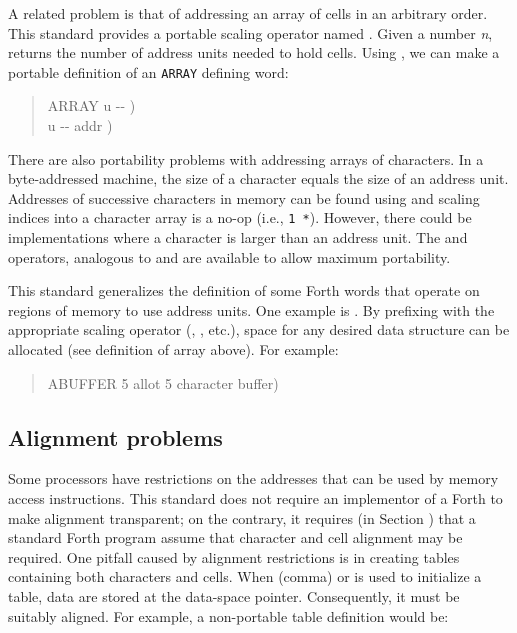 A related problem is that of addressing an array of cells in an
arbitrary order. This standard provides a portable scaling operator named .
Given a number \emph{n},  returns the number of address
units needed to hold  cells.   Using , we can make
a portable definition of an \texttt{ARRAY} defining word:

\begin{quote}\ttfamily
	\word{:} ARRAY  u -{}- )  ~   \\
	\hspace*{2em}  u -{}- addr )   \word{+} \word{;}
\end{quote}

There are also portability problems with addressing arrays of
characters. 
In a byte-addressed machine, the size of a character equals the
size of an address unit.  Addresses of successive characters
in memory can be found using  and scaling indices into a character
array is a no-op (i.e., \texttt{1 *}).  However, there could be
implementations where a character is larger than an address unit.
The  and  operators, analogous to
 and  are available to allow maximum portability.

This standard generalizes the definition of some Forth words that operate
on regions of memory to use address units. One example is
.  By prefixing  with the appropriate scaling operator
(, , etc.), space for any desired data structure can
be allocated (see definition of array above). For example:
\begin{quote}\ttfamily
	 ABUFFER 5  
	 \textrm{allot 5 character buffer})
\end{quote}


\subsection{Alignment problems} %

Some processors have restrictions on the addresses that can be used by
memory access instructions. This standard does not require an
implementor of a Forth to make alignment transparent; on the
contrary, it requires (in Section ) that
a standard Forth program assume that character and cell alignment may be
required.
One pitfall caused by alignment restrictions
is in creating tables containing both characters and cells. When
\word{,} (comma) or  is used to initialize a table, data
are stored at the data-space pointer. Consequently, it must be
suitably aligned. For example, a non-portable table definition
would be:

